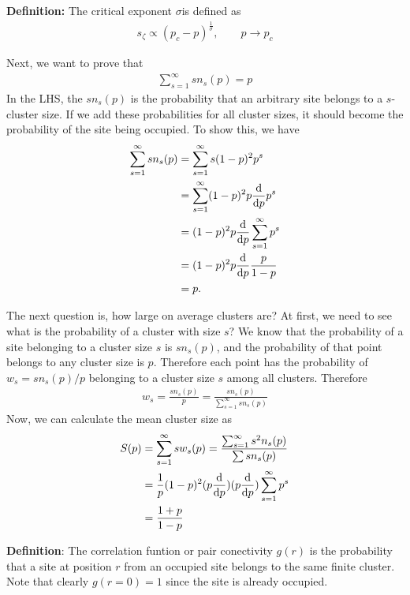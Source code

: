\textbf{Definition:} The critical exponent $\sigma $is defined as
%
\begin{align}
  s_{\zeta} \propto (p_c - p)^{\frac{1}{\sigma} }, \qquad p \to p_c
\end{align}
%

Next, we want to prove that
%
\begin{align}
  \sum_{s=1}^{\infty} s n_s(p) = p 
\end{align}
%
In the LHS, the $s n_s(p)$ is the probability that an arbitrary site
belongs to a $s$-cluster size. If we add these probabilities for all
cluster sizes, it should become the probability of the site being
occupied. To show this, we have
%
\begin{align}
  \sum_{s=1}^{\infty} s n_s(p) &= \sum _{s=1}^{\infty} s (1-p)^2 p^s \\
                               & = \sum_{s =1}^{\infty} (1-p)^2p \frac{\text{d}}{\text{d} p} p ^s \\
                               & = (1-p)^2 p \frac{\text{d} }{\text{d} p} \sum_{s = 1} ^{\infty} p^s \\
                               & = (1-p)^2 p \frac{\text{d} }{\text{d} p } \frac{p}{1-p} \\
  & = p.
\end{align}
%


The next question is, how large on average clusters are? At first, we
need to see what is the probability of a cluster with size $s$? We
know that the probability of a site belonging to a cluster size $s$ is
$sn_s(p)$, and the probability of that point belongs to any cluster
size is $p$. Therefore each point has the probability of $w_s = s n_s(p)/p$
belonging to a cluster size $s$ among all clusters. Therefore
%
\begin{align}
  w_s = \frac{s n_{s}(p)}{p} = \frac{ s n_{s}(p) }{ \sum_{s=1}^{\infty} s n_{s}(p)} 
\end{align}
%
Now, we can calculate the mean cluster size as
%
\begin{align}
  S(p) & = \sum_{s=1}^{\infty} s w_s(p) = \frac{\sum_{s=1}^{\infty} s^2 n_s(p) }{\sum s n_s(p) }   \\
       & = \frac{1}{p} (1-p)^2 (p \frac{\text{d}}{\text{d} p} ) (p \frac{\text{d} }{\text{d} p } ) \sum_{s=1}^{\infty} p^{s}\\
  & = \frac{1+p}{1-p} 
\end{align}



\textbf{Definition}: The correlation funtion or pair conectivity
$g(r)$ is the probability that a site at position $r$ from an occupied
site belongs to the same finite cluster. Note that clearly $g(r= 0) =
1$ since the site is already occupied. 


